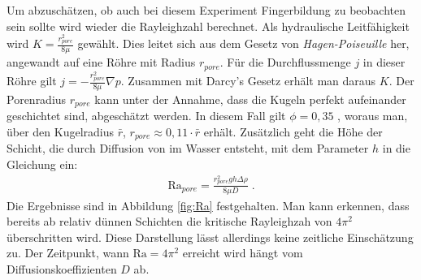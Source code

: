 Um abzuschätzen, ob auch bei diesem Experiment Fingerbildung zu beobachten sein sollte wird wieder die Rayleighzahl berechnet. Als hydraulische Leitfähigkeit wird $K = \frac{r_{pore}^2}{8\mu}$ gewählt. Dies leitet sich aus dem Gesetz von \textit{Hagen-Poiseuille} her, angewandt auf eine Röhre mit Radius $r_{pore}$. Für die Durchflussmenge $j$ in dieser Röhre gilt $j = -\frac{r_{pore}^2}{8\mu} \nabla p$. Zusammen mit Darcy's Gesetz erhält man daraus $K$. 
Der Porenradius $r_{pore}$ kann unter der Annahme, dass die Kugeln perfekt aufeinander geschichtet sind, abgeschätzt werden. In diesem Fall gilt $\phi=0,35$ \citep{song}, woraus man, über den Kugelradius $\bar{r}$, $r_{pore} \approx 0,11 \cdot \bar{r}$ erhält. Zusätzlich geht die Höhe der Schicht, die durch Diffusion von \COT im Wasser entsteht, mit dem Parameter $h$ in die Gleichung ein:
\begin{align}
 \mathrm{Ra}_{pore} = \frac{r_{pore}^2 g h \Delta \rho}{8 \mu D} \; .
 \label{eq:Ra2}
\end{align}
Die Ergebnisse sind in Abbildung \ref{fig:Ra} festgehalten. Man kann erkennen, dass bereits ab relativ dünnen Schichten die kritische Rayleighzah von $4\pi^2$ überschritten wird. Diese Darstellung lässt allerdings keine zeitliche Einschätzung zu. Der Zeitpunkt, wann $\mathrm{Ra} = 4\pi^2$ erreicht wird hängt vom Diffusionskoeffizienten $D$ ab.